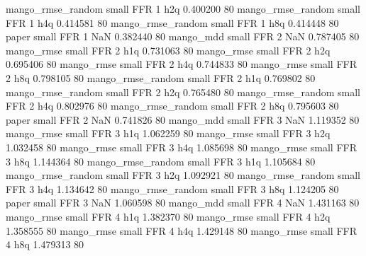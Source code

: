 mango_rmse_random      small      FFR                 1                  h2q  0.400200 80
mango_rmse_random      small      FFR                 1                  h4q  0.414581 80
mango_rmse_random      small      FFR                 1                  h8q  0.414448 80
            paper      small      FFR                 1                  NaN  0.382440 80
        mango_mdd      small      FFR                 2                  NaN  0.787405 80
       mango_rmse      small      FFR                 2                  h1q  0.731063 80
       mango_rmse      small      FFR                 2                  h2q  0.695406 80
       mango_rmse      small      FFR                 2                  h4q  0.744833 80
       mango_rmse      small      FFR                 2                  h8q  0.798105 80
mango_rmse_random      small      FFR                 2                  h1q  0.769802 80
mango_rmse_random      small      FFR                 2                  h2q  0.765480 80
mango_rmse_random      small      FFR                 2                  h4q  0.802976 80
mango_rmse_random      small      FFR                 2                  h8q  0.795603 80
            paper      small      FFR                 2                  NaN  0.741826 80
        mango_mdd      small      FFR                 3                  NaN  1.119352 80
       mango_rmse      small      FFR                 3                  h1q  1.062259 80
       mango_rmse      small      FFR                 3                  h2q  1.032458 80
       mango_rmse      small      FFR                 3                  h4q  1.085698 80
       mango_rmse      small      FFR                 3                  h8q  1.144364 80
mango_rmse_random      small      FFR                 3                  h1q  1.105684 80
mango_rmse_random      small      FFR                 3                  h2q  1.092921 80
mango_rmse_random      small      FFR                 3                  h4q  1.134642 80
mango_rmse_random      small      FFR                 3                  h8q  1.124205 80
            paper      small      FFR                 3                  NaN  1.060598 80
        mango_mdd      small      FFR                 4                  NaN  1.431163 80
       mango_rmse      small      FFR                 4                  h1q  1.382370 80
       mango_rmse      small      FFR                 4                  h2q  1.358555 80
       mango_rmse      small      FFR                 4                  h4q  1.429148 80
       mango_rmse      small      FFR                 4                  h8q  1.479313 80
